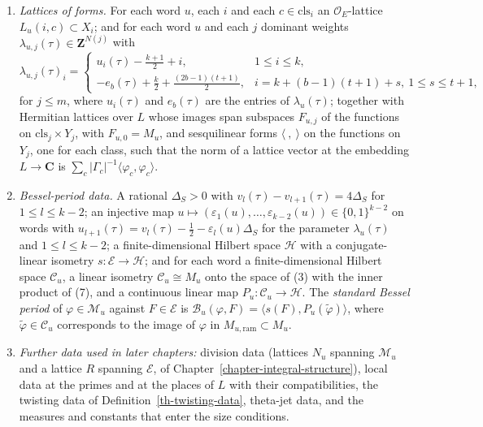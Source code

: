 \begin{definition}
\begin{enumerate}
\[  \rho'_i(c')=\tilde\mu_{i+1}(d_{i+1}(c'))\,\chi_\Delta(d_{i+1}(c'))^{N(i)/2}.
  \]
  The datum also contains relative determinants of pairs of self-dual lattices,
  multiplicative in the pair and given by $\det\gamma$ on translates by a
  unitary matrix $\gamma$.
\item \emph{Lattices of forms.} For each word $u$, each $i$ and each
  $c\in\mathrm{cls}_i$ an $\mathcal O_E$-lattice $L_u(i,c)\subset X_i$; and for
  each word $u$ and each $j$ dominant weights
  $\lambda_{u,j}(\tau)\in\mathbf Z^{N(j)}$ with
  \[
  \lambda_{u,j}(\tau)_i=
  \begin{cases}
  u_i(\tau)-\tfrac{k+1}2+i, & 1\leq i\leq k,\\[2pt]
  -e_b(\tau)+\tfrac k2+\tfrac{(2b-1)(t+1)}2, & i=k+(b-1)(t+1)+s,\ 1\leq s\leq t+1,
  \end{cases}
  \]
  for $j\leq m$, where $u_i(\tau)$ and $e_b(\tau)$ are the entries of
  $\lambda_u(\tau)$; together with Hermitian lattices over $L$ whose images
  span subspaces $F_{u,j}$ of the functions on $\mathrm{cls}_j\times Y_j$, with
  $F_{u,0}=M_u$, and sesquilinear forms $\langle\ ,\ \rangle$ on the
  functions on $Y_j$, one for each class, such that the norm of a lattice
  vector at the embedding $L\to\mathbf C$ is
  $\sum_c|\Gamma_c|^{-1}\langle\varphi_c,\varphi_c\rangle$.
\item \emph{Bessel-period data.} A rational $\Delta_S>0$ with
  $v_l(\tau)-v_{l+1}(\tau)=4\Delta_S$ for $1\leq l\leq k-2$; an injective map
  $u\mapsto(\varepsilon_1(u),\ldots,\varepsilon_{k-2}(u))\in\{0,1\}^{k-2}$ on
  words with
  $u_{l+1}(\tau)=v_l(\tau)-\tfrac12-\varepsilon_l(u)\Delta_S$ for the
  parameter $\lambda_u(\tau)$ and $1\leq l\leq k-2$; a finite-dimensional
  Hilbert space $\mathcal H$ with a conjugate-linear isometry
  $s\colon\mathcal E\to\mathcal H$; and for each word a finite-dimensional
  Hilbert space $\mathcal C_u$, a linear isometry $\mathcal C_u\cong M_u$ onto
  the space of (3) with the inner product of (7), and a continuous linear map
  $P_u\colon\mathcal C_u\to\mathcal H$. The \emph{standard Bessel period} of
  $\varphi\in\mathcal M_u$ against $F\in\mathcal E$ is
  $\mathcal B_u(\varphi,F)=\langle s(F),P_u(\tilde\varphi)\rangle$, where
  $\tilde\varphi\in\mathcal C_u$ corresponds to the image of $\varphi$ in
  $M_{u,\mathrm{ram}}\subset M_u$.
\item \emph{Further data used in later chapters:} division data (lattices
  $N_u$ spanning $\mathcal M_u$ and a lattice $R$ spanning $\mathcal E$, of
  Chapter~\ref{chapter-integral-structure}), local data at the primes and at
  the places of $L$ with their compatibilities, the twisting data of
  Definition~\ref{th-twisting-data}, theta-jet data, and the measures and
  constants that enter the size conditions.
\end{enumerate}
\end{definition}
